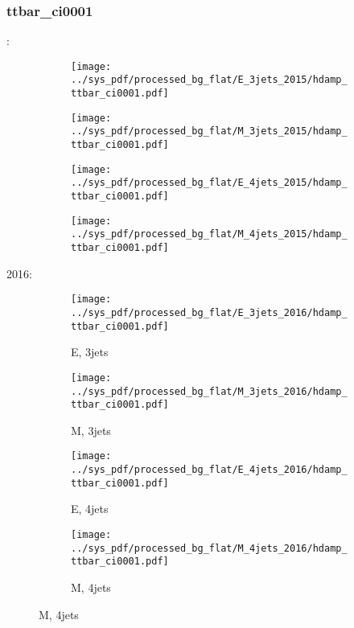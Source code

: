 \documentclass{beamer}
\begin{document}
\begin{frame}
\frametitle{ttbar_ci0001}
\fontsize{5}{1}:
\begin{figure}
\centering
\begin{subfigure}[b]{0.24\textwidth}
\texttt{[image: ../sys\_pdf/processed\_bg\_flat/E\_3jets\_2015/hdamp\_ttbar\_ci0001.pdf]}
\end{subfigure}
\begin{subfigure}[b]{0.24\textwidth}
\texttt{[image: ../sys\_pdf/processed\_bg\_flat/M\_3jets\_2015/hdamp\_ttbar\_ci0001.pdf]}
\end{subfigure}
\begin{subfigure}[b]{0.24\textwidth}
\texttt{[image: ../sys\_pdf/processed\_bg\_flat/E\_4jets\_2015/hdamp\_ttbar\_ci0001.pdf]}
\end{subfigure}
\begin{subfigure}[b]{0.24\textwidth}
\texttt{[image: ../sys\_pdf/processed\_bg\_flat/M\_4jets\_2015/hdamp\_ttbar\_ci0001.pdf]}
\end{subfigure}
\end{figure}
2016:
\begin{figure}
\centering
\begin{subfigure}[b]{0.24\textwidth}
\texttt{[image: ../sys\_pdf/processed\_bg\_flat/E\_3jets\_2016/hdamp\_ttbar\_ci0001.pdf]}
\captionsetup{font=tiny}
\caption{E, 3jets}
\end{subfigure}
\begin{subfigure}[b]{0.24\textwidth}
\texttt{[image: ../sys\_pdf/processed\_bg\_flat/M\_3jets\_2016/hdamp\_ttbar\_ci0001.pdf]}
\captionsetup{font=tiny}
\caption{M, 3jets}
\end{subfigure}
\begin{subfigure}[b]{0.24\textwidth}
\texttt{[image: ../sys\_pdf/processed\_bg\_flat/E\_4jets\_2016/hdamp\_ttbar\_ci0001.pdf]}
\captionsetup{font=tiny}
\caption{E, 4jets}
\end{subfigure}
\begin{subfigure}[b]{0.24\textwidth}
\texttt{[image: ../sys\_pdf/processed\_bg\_flat/M\_4jets\_2016/hdamp\_ttbar\_ci0001.pdf]}
\captionsetup{font=tiny}
\caption{M, 4jets}
\end{subfigure}
\end{figure}
\end{frame}
\end{document}
